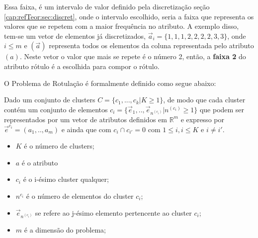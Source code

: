 Essa faixa, é um intervalo de valor definido pela discretização seção \ref{cap:refTeor:sec:discret}, onde o intervalo escolhido, seria a faixa que representa os valores que se repetem com a maior frequência no atributo. A exemplo disso, tem-se um vetor de elementos já discretizados, ${\vec{a}_i=\{1,1,1,2,2,2,2,3,3\}}$, onde $i\leqslant m$ e ${(\vec{a})}$ representa todos os elementos da coluna representada pelo atributo  ${(a)}$. Neste vetor o valor que mais se repete é o número 2, então, a \textbf{faixa 2} do atributo rótulo é a escolhida para compor o rótulo.

O Problema de Rotulação é formalmente definido como segue abaixo:
    \begin{teorema}
    Dado um conjunto de clusters ${C=\{c_1,...,c_k | K \geqslant 1\} }$, de modo que cada cluster contém um conjunto de elementos ${c_i=\{\vec{e}_1,..,\vec{e}_{n^{(c_i)}}|n^{(c_i)} \geqslant 1 \}}$ que podem ser representados por um vetor de atributos definidos em ${\mathbb{R}^m }$ e expresso por ${ \vec{e}^{c_i}=(a_1,..,a_m)  }$ e ainda que  com ${ c_i \cap c_{i'}=0 }$ com ${ 1 \leqslant i, i \leqslant K  }$ e ${ i \neq i' }$.
        \footnotemark 
        \begin{itemize}[noitemsep]
            \item ${K}$ é o número de clusters;
            \item ${a}$ é o atributo
            \item ${c_i}$ é o i-ésimo cluster qualquer;
            \item ${n^{c_i}}$ é o número de elementos do cluster ${c_i}$;
            \item ${\vec{e}_{n^{(c_i)}}}$ se refere ao j-ésimo elemento pertencente ao cluster ${c_i}$;
            \item ${m}$ é a dimensão do problema;
        \end{itemize}
    \label{teo:problema}
    \end{teorema}



